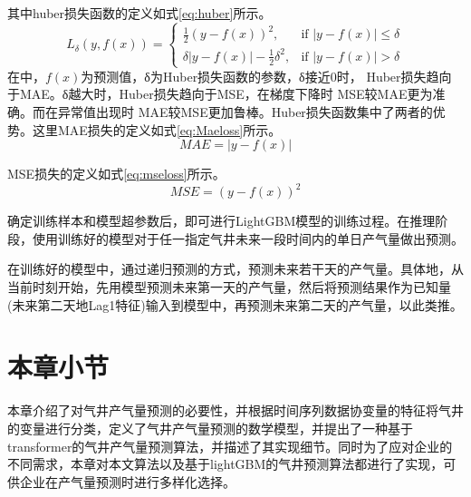 其中huber损失函数的定义如式\eqref{eq:huber}所示。
\begin{equation}
    L_{\delta}(y, f(x)) = 
        \begin{cases} 
        \frac{1}{2}(y - f(x))^2, & \text{if } |y - f(x)| \leq \delta \\
        \delta|y - f(x)| - \frac{1}{2}\delta^2, & \text{if } |y - f(x)| > \delta
        \end{cases}
    \label{eq:huber}
\end{equation}
在中，\(f(x)\)为预测值，δ为Huber损失函数的参数，δ接近0时，
Huber损失趋向于MAE。δ越大时，Huber损失趋向于MSE，在梯度下降时 MSE较MAE更为准确。而在异常值出现时 MAE较MSE更加鲁棒。Huber损失函数集中了两者的优势。这里MAE损失的定义如式\eqref{eq:Maeloss}所示。
\begin{equation}
    MAE = |y - f(x)|
    \label{eq:Maeloss}
\end{equation}

MSE损失的定义如式\eqref{eq:mseloss}所示。
\begin{equation}
    MSE = (y - f(x))^2
    \label{eq:mseloss}
\end{equation}

确定训练样本和模型超参数后，即可进行LightGBM模型的训练过程。在推理阶段，使用训练好的模型对于任一指定气井未来一段时间内的单日产气量做出预测。

在训练好的模型中，通过递归预测的方式，预测未来若干天的产气量。具体地，从当前时刻开始，先用模型预测未来第一天的产气量，然后将预测结果作为已知量(未来第二天地Lag1特征)输入到模型中，再预测未来第二天的产气量，以此类推。

\section{本章小节}
本章介绍了对气井产气量预测的必要性，并根据时间序列数据协变量的特征将气井的变量进行分类，定义了气井产气量预测的数学模型，并提出了一种基于transformer的气井产气量预测算法，并描述了其实现细节。同时为了应对企业的不同需求，本章对本文算法以及基于lightGBM的气井预测算法都进行了实现，可供企业在产气量预测时进行多样化选择。
